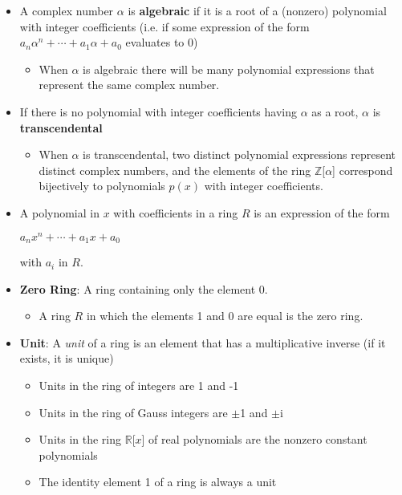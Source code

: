 \documentclass[12pt]{article}
\begin{document}
\begin{itemize}
\begin{itemize}
\begin{itemize}
    \end{itemize}
  \end{itemize}
  \item A complex number $\alpha$ is \textbf{algebraic} if it is a root of a (nonzero) polynomial with integer coefficients (i.e. if some expression of the form $a_n\alpha^n + \cdots + a_1\alpha + a_0$ evaluates to 0)
  \begin{itemize}
    \item When $\alpha$ is algebraic there will be many polynomial expressions that represent the same complex number.
  \end{itemize}
  \item If there is no polynomial with integer coefficients having $\alpha$ as a root, $\alpha$ is \textbf{transcendental}
  \begin{itemize}
    \item When $\alpha$ is transcendental, two distinct polynomial expressions represent distinct complex numbers, and the elements of the ring $\mathbb{Z}$[$\alpha$] correspond bijectively to polynomials $p(x)$ with integer coefficients.
  \end{itemize}
  \item A polynomial in $x$ with coefficients in a ring $R$ is an expression of the form
  \begin{center}
    $a_nx^n + \cdots + a_1x + a_0$
  \end{center}
  with $a_i$ in $R$.
  \item \textbf{Zero Ring}: A ring containing only  the element 0.
  \begin{itemize}
    \item A ring $R$ in which the elements 1 and 0 are equal is the zero ring.
  \end{itemize}
  \item \textbf{Unit}: A \textit{unit} of a ring is an element that has a multiplicative inverse (if it exists, it is unique)
  \begin{itemize}
    \item Units in the ring of integers are 1 and -1
    \item Units in the ring of Gauss integers are $\pm$1 and $\pm$i
    \item Units in the ring $\mathbb{R}$[$x$] of real polynomials are the nonzero constant polynomials
    \item The identity element 1 of a ring is always a unit
  \end{itemize}
\end{itemize}
\end{document}
